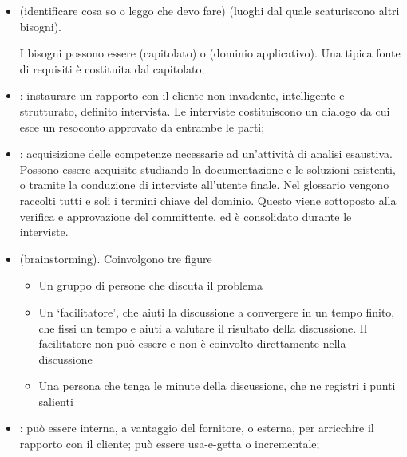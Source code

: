 \begin{itemize}
  \item {} (identificare cosa so o leggo che devo
    fare)  (luoghi dal quale scaturiscono altri
    bisogni).

    I bisogni possono essere  (capitolato) o
     (dominio applicativo). Una tipica fonte di requisiti è
    costituita dal capitolato;
  \item {}: instaurare un rapporto
    con il cliente non invadente, intelligente e strutturato, definito
    intervista. Le interviste costituiscono un dialogo da cui esce un
    resoconto approvato da entrambe le parti;
  \item {}: acquisizione delle competenze necessarie ad
    un'attività di analisi esaustiva. Possono essere acquisite studiando la
    documentazione e le soluzioni esistenti, o tramite la conduzione di interviste
    all'utente finale. Nel glossario vengono raccolti tutti e soli i termini
    chiave del dominio. Questo viene sottoposto alla verifica e approvazione del
    committente, ed è consolidato durante le interviste.
  \item {} (brainstorming). Coinvolgono tre
    figure
    \begin{itemize}
      \item Un gruppo di persone che discuta il problema
      \item Un `facilitatore', che aiuti la discussione a convergere in un
            tempo finito, che fissi un tempo e aiuti a valutare il risultato
            della discussione. Il facilitatore non può essere
             e non è coinvolto direttamente nella
            discussione
      \item Una persona che tenga le minute della discussione, che ne
            registri i punti salienti
    \end{itemize}

  \item {}: può essere interna, a vantaggio del
    fornitore, o esterna, per arricchire il rapporto con il cliente;
    può essere usa-e-getta o incrementale;
  

\end{itemize}
